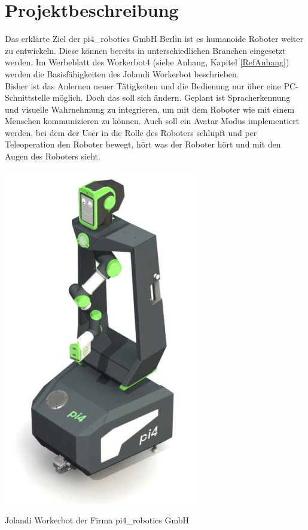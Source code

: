 \section{Projektbeschreibung}
Das erklärte Ziel der pi4\_robotics GmbH Berlin ist es humanoide Roboter weiter zu entwickeln. 
Diese können bereits in unterschiedlichen Branchen eingesetzt werden. Im Werbeblatt 
des Workerbot4 (siehe Anhang, Kapitel \ref{RefAnhang}) werden die Basisfähigkeiten des Jolandi Workerbot beschrieben.  \\
Bisher ist das Anlernen neuer Tätigkeiten und die Bedienung nur über eine PC-Schnittstelle möglich. Doch das soll sich ändern. Geplant ist Spracherkennung und visuelle Wahrnehmung 
zu integrieren, um mit dem Roboter wie mit einem Menschen kommunizieren zu können. Auch soll 
ein Avatar Modus implementiert werden, bei dem der User in die Rolle des Roboters schlüpft 
und per Teleoperation den Roboter bewegt, hört was der Roboter hört und mit den Augen des Roboters sieht. \\
\begin{minipage}{\textwidth}
    \begin{center}
        \includegraphics[scale=0.5]{img/jolandi.jpg} 
    \end{center}
\end{minipage}
\begin{center}
Jolandi Workerbot der Firma pi4\_robotics GmbH
\end{center}
 
